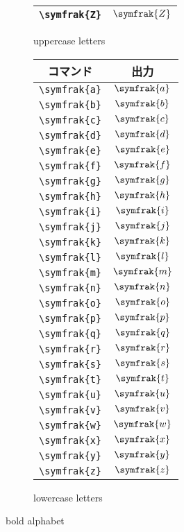 \begin{figure}[htbp]
\begin{subfigure}{.5\textwidth}
\begin{tabular}{cc}
            \verb|\symfrak{Z}| & \(\symfrak{Z}\) \\
            \bottomrule
        \end{tabular}
        \caption{uppercase letters}
        \label{fig:uppercase}
    \end{subfigure}%
    \begin{subfigure}{.5\textwidth}
        \centering
        \begin{tabular}{cc}
            \toprule
            コマンド           & 出力            \\
            \midrule
            \verb|\symfrak{a}| & \(\symfrak{a}\) \\
            \verb|\symfrak{b}| & \(\symfrak{b}\) \\
            \verb|\symfrak{c}| & \(\symfrak{c}\) \\
            \verb|\symfrak{d}| & \(\symfrak{d}\) \\
            \verb|\symfrak{e}| & \(\symfrak{e}\) \\
            \verb|\symfrak{f}| & \(\symfrak{f}\) \\
            \verb|\symfrak{g}| & \(\symfrak{g}\) \\
            \verb|\symfrak{h}| & \(\symfrak{h}\) \\
            \verb|\symfrak{i}| & \(\symfrak{i}\) \\
            \verb|\symfrak{j}| & \(\symfrak{j}\) \\
            \verb|\symfrak{k}| & \(\symfrak{k}\) \\
            \verb|\symfrak{l}| & \(\symfrak{l}\) \\
            \verb|\symfrak{m}| & \(\symfrak{m}\) \\
            \verb|\symfrak{n}| & \(\symfrak{n}\) \\
            \verb|\symfrak{o}| & \(\symfrak{o}\) \\
            \verb|\symfrak{p}| & \(\symfrak{p}\) \\
            \verb|\symfrak{q}| & \(\symfrak{q}\) \\
            \verb|\symfrak{r}| & \(\symfrak{r}\) \\
            \verb|\symfrak{s}| & \(\symfrak{s}\) \\
            \verb|\symfrak{t}| & \(\symfrak{t}\) \\
            \verb|\symfrak{u}| & \(\symfrak{u}\) \\
            \verb|\symfrak{v}| & \(\symfrak{v}\) \\
            \verb|\symfrak{w}| & \(\symfrak{w}\) \\
            \verb|\symfrak{x}| & \(\symfrak{x}\) \\
            \verb|\symfrak{y}| & \(\symfrak{y}\) \\
            \verb|\symfrak{z}| & \(\symfrak{z}\) \\
            \bottomrule
        \end{tabular}
        \caption{lowercase letters}
        \label{fig:lowercase}
    \end{subfigure}
    \caption{bold alphabet}
    \label{fig:bold_alphabet}
\end{figure}
